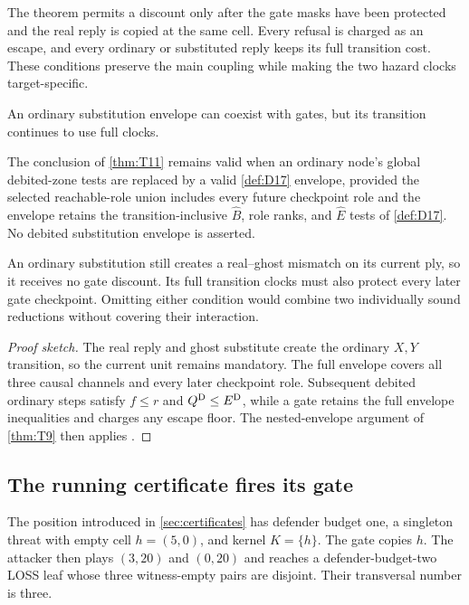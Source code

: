 \begin{plainterms}
The theorem permits a discount only after the gate masks have been protected
and the real reply is copied at the same cell.  Every refusal is charged as an
escape, and every ordinary or substituted reply keeps its full transition
cost.  These conditions preserve the main coupling while making the two
hazard clocks target-specific.
\end{plainterms}

An ordinary substitution envelope can coexist with gates, but its transition
continues to use full clocks.

\begin{theorem}
\label{thm:T11.1}
The conclusion of \cref{thm:T11} remains valid when an ordinary node's global
debited-zone tests are replaced by a valid \cref{def:D17} envelope, provided
the selected reachable-role union includes every future checkpoint role and
the envelope retains the transition-inclusive $\widehat B$, role ranks, and
$\widehat E$ tests of \cref{def:D17}.  No debited substitution envelope is
asserted.
\end{theorem}

\begin{plainterms}
An ordinary substitution still creates a real--ghost mismatch on its current
ply, so it receives no gate discount.  Its full transition clocks must also
protect every later gate checkpoint.  Omitting either condition would combine
two individually sound reductions without covering their interaction.
\end{plainterms}

\begin{proof}[Proof sketch]
The real reply and ghost substitute create the ordinary $X,Y$ transition, so
the current unit remains mandatory.  The full envelope covers all three
causal channels and every later checkpoint role.  Subsequent debited ordinary
steps satisfy $f\le r$ and $Q^{\mathrm{D}}\le E^{\mathrm{D}}$, while a gate retains the full
envelope inequalities and charges any escape floor.  The nested-envelope
argument of \cref{thm:T9} then applies \cite{hexobot-companions}.
\end{proof}

\subsection{The running certificate fires its gate}

The position introduced in \cref{sec:certificates} has defender budget one,
a singleton threat with empty cell $h=(5,0)$, and kernel $K=\{h\}$.  The
gate copies $h$.  The attacker then plays $(3,20)$ and $(0,20)$ and reaches a
defender-budget-two LOSS leaf whose three witness-empty pairs are disjoint.
Their transversal number is three.

